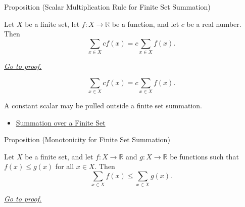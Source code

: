 \begin{propositionbox}{Proposition (Scalar Multiplication Rule for Finite Set Summation)}
\begin{proposition}
\label{prop:scalar-multiplication-rule-finite-set-summation}

Let \(X\) be a finite set, let \(f:X\to\mathbb{R}\) be a function, and
let \(c\) be a real number. Then
\[
  \sum_{x\in X} c f(x)
  =
  c \sum_{x\in X} f(x).
\]

\smallskip
\noindent
\hyperref[prf:scalar-multiplication-rule-finite-set-summation]{\textit{Go to proof.}}
\end{proposition}
\end{propositionbox}

\begin{remark*}
\[
  \sum_{x\in X}c f(x)=c\sum_{x\in X}f(x).
\]
\end{remark*}

\begin{remark*}[Interpretation]
A constant scalar may be pulled outside a finite set summation.
\end{remark*}

\begin{dependencies}
\begin{itemize}
  \item \hyperref[def:summation-over-finite-set]{Summation over a Finite Set}
\end{itemize}
\end{dependencies}

\begin{propositionbox}{Proposition (Monotonicity for Finite Set Summation)}
\begin{proposition}
\label{prop:monotonicity-finite-set-summation}

Let \(X\) be a finite set, and let \(f:X\to\mathbb{R}\) and
\(g:X\to\mathbb{R}\) be functions such that \(f(x)\le g(x)\) for all
\(x\in X\). Then
\[
  \sum_{x\in X} f(x)
  \le
  \sum_{x\in X} g(x).
\]

\smallskip
\noindent
\hyperref[prf:monotonicity-finite-set-summation]{\textit{Go to proof.}}
\end{proposition}
\end{propositionbox}

